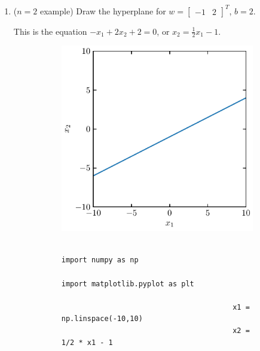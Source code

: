 \documentclass{article}
\newenvironment{solution}{\begin{adjustwidth}{8mm}{}}{\end{adjustwidth}}
\begin{document}
\begin{enumerate}
        \item ($n = 2$ example)
                Draw the hyperplane for $w = \begin{bmatrix} -1 & 2 \end{bmatrix}^T$, $b=2$.
        \begin{solution}
                This is the equation $-x_1 + 2x_2 + 2 = 0$, or $x_2 = \frac{1}{2} x_1 - 1$.
                \begin{figure}[h]
                        \begin{subfigure}{0.5\linewidth}
                                \centering
                                \includegraphics[width=\linewidth]{A9a.pdf}
                        \end{subfigure}
                        \hfill
                        \begin{subfigure}{0.40\linewidth}
                                \centering
                                \begin{verbatim}
                                        import numpy as np
                                        import matplotlib.pyplot as plt
                        
                                        x1 = np.linspace(-10,10)
                                        x2 = 1/2 * x1 - 1
                        

\end{verbatim}
\end{subfigure}
\end{figure}
\end{solution}
\end{enumerate}
\end{document}
